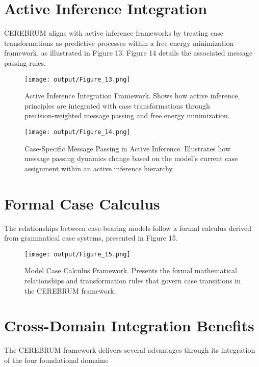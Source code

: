 \hypertarget{active-inference-integration}{%
\section{Active Inference
Integration}\label{active-inference-integration}}

CEREBRUM aligns with active inference frameworks by treating case
transformations as predictive processes within a free energy
minimization framework, as illustrated in Figure 13. Figure 14 details
the associated message passing rules.

\begin{figure}
\centering
\texttt{[image: output/Figure\_13.png]}
\caption{Active Inference Integration Framework. Shows how active
inference principles are integrated with case transformations through
precision-weighted message passing and free energy minimization.}
\end{figure}

\begin{figure}
\centering
\texttt{[image: output/Figure\_14.png]}
\caption{Case-Specific Message Passing in Active Inference. Illustrates
how message passing dynamics change based on the model's current case
assignment within an active inference hierarchy.}
\end{figure}

\hypertarget{formal-case-calculus}{%
\section{Formal Case Calculus}\label{formal-case-calculus}}

The relationships between case-bearing models follow a formal calculus
derived from grammatical case systems, presented in Figure 15.

\begin{figure}
\centering
\texttt{[image: output/Figure\_15.png]}
\caption{Model Case Calculus Framework. Presents the formal mathematical
relationships and transformation rules that govern case transitions in
the CEREBRUM framework.}
\end{figure}

\hypertarget{cross-domain-integration-benefits}{%
\section{Cross-Domain Integration
Benefits}\label{cross-domain-integration-benefits}}

The CEREBRUM framework delivers several advantages through its
integration of the four foundational domains:

